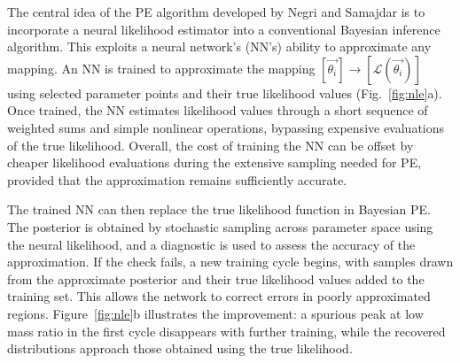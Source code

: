 \documentclass[11pt,a4paper]{article}
\begin{document}
The central idea of the PE algorithm developed by Negri and Samajdar\cite{negri2025} is to incorporate a neural likelihood estimator into a conventional Bayesian inference algorithm. This exploits a neural network's (NN's) ability to approximate any mapping. An NN is trained to approximate the mapping $[\vec{\theta_{i}}]\rightarrow[\mathcal{L}(\vec{{\theta_{i}}})]$ using selected parameter points and their true likelihood values (Fig.~\ref{fig:nle}a). Once trained, the NN estimates likelihood values through a short sequence of weighted sums and simple nonlinear operations, bypassing expensive evaluations of the true likelihood. Overall, the cost of training the NN can be offset by cheaper likelihood evaluations during the extensive sampling needed for PE, provided that the approximation remains sufficiently accurate.



The trained NN can then replace the true likelihood function in Bayesian PE. The posterior is obtained by stochastic sampling across parameter space using the neural likelihood, and a diagnostic is used to assess the accuracy of the approximation. If the check fails, a new training cycle begins, with samples drawn from the approximate posterior and their true likelihood values added to the training set. This allows the network to correct errors in poorly approximated regions. Figure~\ref{fig:nle}b illustrates the improvement: a spurious peak at low mass ratio in the first cycle disappears with further training, while the recovered distributions approach those obtained using the true likelihood.


\end{document}
